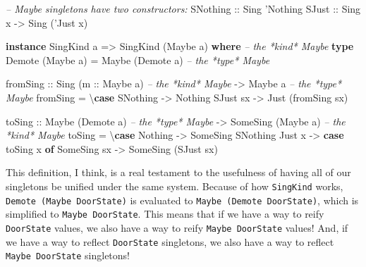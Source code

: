 \documentclass[]{article}
\newenvironment{Shaded}{}{}
\newcommand{\KeywordTok}[1]{\textcolor[rgb]{0.00,0.44,0.13}{\textbf{#1}}}
\newcommand{\DataTypeTok}[1]{\textcolor[rgb]{0.56,0.13,0.00}{#1}}
\newcommand{\CharTok}[1]{\textcolor[rgb]{0.25,0.44,0.63}{#1}}
\newcommand{\CommentTok}[1]{\textcolor[rgb]{0.38,0.63,0.69}{\textit{#1}}}
\newcommand{\OtherTok}[1]{\textcolor[rgb]{0.00,0.44,0.13}{#1}}
\newcommand{\FunctionTok}[1]{\textcolor[rgb]{0.02,0.16,0.49}{#1}}
\newcommand{\NormalTok}[1]{#1}
\begin{document}
\begin{Shaded}
\begin{Highlighting}[]
\CommentTok{-- Maybe singletons have two constructors:}
\DataTypeTok{SNothing}\OtherTok{ ::} \DataTypeTok{Sing} \CharTok{'Nothing}
\DataTypeTok{SJust}\OtherTok{    ::} \DataTypeTok{Sing}\NormalTok{ x }\OtherTok{->} \DataTypeTok{Sing}\NormalTok{ (}\CharTok{'Just x)}

\KeywordTok{instance} \DataTypeTok{SingKind}\NormalTok{ a }\OtherTok{=>} \DataTypeTok{SingKind}\NormalTok{ (}\DataTypeTok{Maybe}\NormalTok{ a) }\KeywordTok{where}     \CommentTok{-- the *kind* Maybe}
    \KeywordTok{type} \DataTypeTok{Demote}\NormalTok{ (}\DataTypeTok{Maybe}\NormalTok{ a) }\FunctionTok{=} \DataTypeTok{Maybe}\NormalTok{ (}\DataTypeTok{Demote}\NormalTok{ a)        }\CommentTok{-- the *type* Maybe}

\NormalTok{    fromSing}
\OtherTok{        ::} \DataTypeTok{Sing}\NormalTok{ (}\OtherTok{m ::} \DataTypeTok{Maybe}\NormalTok{ a)        }\CommentTok{-- the *kind* Maybe}
        \OtherTok{->} \DataTypeTok{Maybe}\NormalTok{ a                    }\CommentTok{-- the *type* Maybe}
\NormalTok{    fromSing }\FunctionTok{=}\NormalTok{ \textbackslash{}}\KeywordTok{case}
        \DataTypeTok{SNothing} \OtherTok{->} \DataTypeTok{Nothing}
        \DataTypeTok{SJust}\NormalTok{ sx }\OtherTok{->} \DataTypeTok{Just}\NormalTok{ (fromSing sx)}

\NormalTok{    toSing}
\OtherTok{        ::} \DataTypeTok{Maybe}\NormalTok{ (}\DataTypeTok{Demote}\NormalTok{ a)             }\CommentTok{-- the *type* Maybe}
        \OtherTok{->} \DataTypeTok{SomeSing}\NormalTok{ (}\DataTypeTok{Maybe}\NormalTok{ a)           }\CommentTok{-- the *kind* Maybe}
\NormalTok{    toSing }\FunctionTok{=}\NormalTok{ \textbackslash{}}\KeywordTok{case}
        \DataTypeTok{Nothing} \OtherTok{->} \DataTypeTok{SomeSing} \DataTypeTok{SNothing}
        \DataTypeTok{Just}\NormalTok{ x  }\OtherTok{->} \KeywordTok{case}\NormalTok{ toSing x }\KeywordTok{of}
          \DataTypeTok{SomeSing}\NormalTok{ sx }\OtherTok{->} \DataTypeTok{SomeSing}\NormalTok{ (}\DataTypeTok{SJust}\NormalTok{ sx)}
\end{Highlighting}
\end{Shaded}

This definition, I think, is a real testament to the usefulness of having all of
our singletons be unified under the same system. Because of how
\texttt{SingKind} works, \texttt{Demote\ (Maybe\ DoorState)} is evaluated to
\texttt{Maybe\ (Demote\ DoorState)}, which is simplified to
\texttt{Maybe\ DoorState}. This means that if we have a way to reify
\texttt{DoorState} values, we also have a way to reify \texttt{Maybe\ DoorState}
values! And, if we have a way to reflect \texttt{DoorState} singletons, we also
have a way to reflect \texttt{Maybe\ DoorState} singletons!
\end{document}
